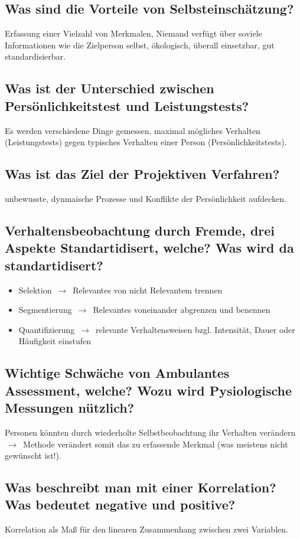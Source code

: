 \documentclass[a6paper,9pt,DIV=14]{scrartcl}
\begin{document}
\subsection{Was sind die Vorteile von Selbsteinschätzung?}%
    Erfassung einer Vielzahl von Merkmalen, Niemand verfügt über soviele Informationen wie die Zielperson selbst, ökologisch, überall einsetzbar, gut standardisierbar.
\subsection{Was ist der Unterschied zwischen Persönlichkeitstest und Leistungstests?} %
    Es werden verschiedene Dinge gemessen, maximal mögliches Verhalten (Leistungstests) gegen typisches Verhalten einer Person (Persönlichkeitstests).
\subsection{Was ist das Ziel der Projektiven Verfahren?}
    unbewusste, dynmaische Prozesse und Konflikte der Persönlichkeit aufdecken.
\subsection{Verhaltensbeobachtung durch Fremde, drei Aspekte Standartidisert, welche? Was wird da standartidisert?}
    \begin{itemize}
    \item Selektion $\,\to\,$ Relevantes von nicht Relevantem trennen
    \item Segmentierung $\,\to\,$ Relevantes voneinander abgrenzen und benennen
    \item Quantifizierung $\,\to\,$ relevante Verhaltensweisen bzgl. Intensität, Dauer oder Häufigkeit einstufen
    \end{itemize}
\subsection{Wichtige Schwäche von Ambulantes Assessment, welche? Wozu wird Pysiologische Messungen nützlich?}
    Personen könnten durch wiederholte Selbstbeobachtung ihr Verhalten verändern $\,\to\,$ Methode verändert somit das zu erfassende Merkmal (was meistens nicht gewünscht ist!).
\subsection{Was beschreibt man mit einer Korrelation? Was bedeutet negative und positive?} %
    Korrelation als Maß für den linearen Zusammenhang zwischen zwei Variablen.\\
\end{document}
